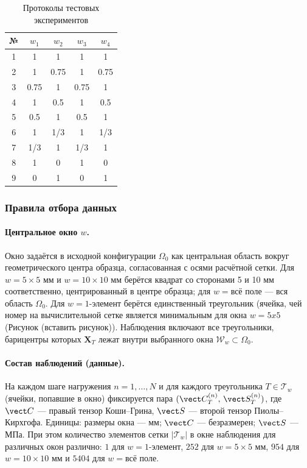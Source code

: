 \begin{table}[H]
\centering
\caption{Протоколы тестовых экспериментов}
\label{tab:test_protocols}
\begin{tabular}{|c|c|c|c|c|}
\hline
\textbf{№} & $w_1$ & $w_2$ & $w_3$ & $w_4$ \\
\hline
1 & 1 & 1 & 1 & 1 \\
2 & 1 & 0.75 & 1 & 0.75 \\
3 & 0.75 & 1 & 0.75 & 1 \\
4 & 1 & 0.5 & 1 & 0.5 \\
5 & 0.5 & 1 & 0.5 & 1 \\
6 & 1 & 1/3 & 1 & 1/3 \\
7 & 1/3 & 1 & 1/3 & 1 \\
8 & 1 & 0 & 1& 0 \\
9 & 0 & 1 & 0 & 1 \\
\hline
\end{tabular}
\end{table}

\subsubsection{Правила отбора данных}
\paragraph{Центральное окно $w$.}
Окно задаётся в исходной конфигурации $\Omega_0$ как центральная область вокруг геометрического центра образца, согласованная с осями расчётной сетки.
Для $w=5\times5$ мм и $w=10\times10$ мм берётся квадрат со сторонами 5 и 10 мм соответственно, центрированный в центре образца; для $w=\text{всё поле}$ — вся область $\Omega_0$.
Для $w=\text{1-элемент}$ берётся единственный треугольник (ячейка, чей номер на вычислительной сетке является минимальным для окна $w = 5x5$ (Рисунок (вставить рисунок)).
Наблюдения включают все треугольники, барицентры которых $\mathbf{X}_T$ лежат внутри выбранного окна $\mathcal{W}_w\subset\Omega_0$.

\paragraph{Состав наблюдений (данные).}
На каждом шаге нагружения $n=1,\dots,N$ и для каждого треугольника $T\in\mathcal{T}_w$ (ячейки, попавшие в окно) фиксируется пара $(\vect C_T^{(n)},\,\vect S_T^{(n)})$, 
где $\vect C$ — правый тензор Коши–Грина, $\vect S$ — второй тензор Пиолы–Кирхгофа.
Единицы: размеры окна — мм; $\vect C$ — безразмерен; $\vect S$ — МПа. 
При этом количество элементов сетки 
$|\mathcal{T}_w|$ в окне наблюдения  для различных окон различно: 
$1$ для $w=\text{1-элемент}$, $252$ для $w=5\times5$ мм, $954$ для $w=10\times10$ мм и $5404$ для $w=\text{всё поле}$.

